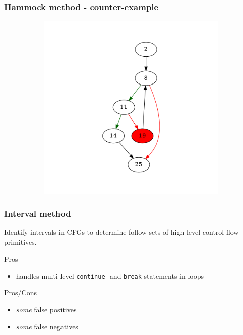 \documentclass[aspectratio=1610]{beamer}
\begin{document}
\begin{frame}
	\frametitle{Hammock method - counter-example}
	\begin{figure}[htbp]
		\centering
		\begin{subfigure}[b]{0.50\textwidth}
			\centering
			\includegraphics[height=0.6\paperheight]{inc/methods/hammock/counter-example/with-break/main_0001b.png}
		\end{subfigure}
	\end{figure}
\end{frame}


\begin{frame}
	\frametitle{Interval method}

	Identify intervals in CFGs to determine follow sets of high-level control flow primitives.

	\vspace*{2em}

	\begin{block}{Pros}
		\begin{itemize}
			\item handles multi-level \texttt{continue}- and \texttt{break}-statements in loops
		\end{itemize}
	\end{block}

	\begin{block}{Pros/Cons}
		\begin{itemize}
			\item \textit{some} false positives
			\item \textit{some} false negatives
		\end{itemize}
	\end{block}


\end{frame}
\end{document}
